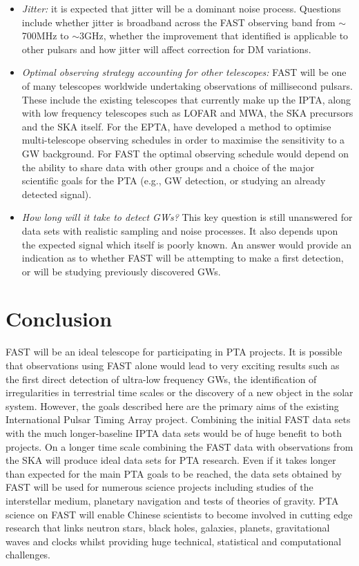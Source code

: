 \documentclass{raa}            %
\begin{document}
\begin{itemize}
\item \emph{Jitter:} it is expected that jitter will be a dominant noise process.  Questions include whether jitter is broadband across the FAST observing band from $\sim$700MHz  to $\sim$3GHz, whether the improvement that \cite{ovdb13} identified is applicable to other pulsars and how jitter will affect correction for DM variations.

\item \emph{Optimal observing strategy accounting for other telescopes:} FAST will be one of many telescopes worldwide undertaking observations of millisecond pulsars.  These include the existing telescopes that currently make up the IPTA, along with low frequency telescopes such as LOFAR and MWA, the SKA precursors and the SKA itself.  For the EPTA, \cite{lbj+12} have developed a method to optimise multi-telescope observing schedules in order to maximise the sensitivity to a GW background. For FAST the optimal observing schedule would depend on the ability to share data with other groups and a choice of the major scientific goals for the PTA (e.g., GW detection, or studying an already detected signal).

\item \emph{How long will it take to detect GWs?} This key question is still unanswered for data sets with realistic sampling and noise processes. It also depends upon the expected signal which itself is poorly known. An answer would provide an indication as to whether FAST will be attempting to make a first detection, or will be studying previously discovered GWs.
\end{itemize}

\section{Conclusion}

FAST will be an ideal telescope for participating in PTA projects.  It is possible that observations using FAST alone would lead to very exciting results such as the first direct detection of ultra-low frequency GWs, the identification of irregularities in terrestrial time scales or the discovery of a new object in the solar system.  However, the goals described here are the primary aims of the existing International Pulsar Timing Array project.  Combining the initial FAST data sets with the much longer-baseline IPTA data sets would be of huge benefit to both projects.  On a longer time scale combining the FAST data with observations from the SKA will produce ideal data sets for PTA research.  Even if it takes longer than expected for the main PTA goals to be reached, the data sets obtained by FAST will be used for numerous science projects including studies of the interstellar medium, planetary navigation and tests of theories of gravity. PTA science on FAST will enable Chinese scientists to become involved in cutting edge research that links neutron stars, black holes, galaxies, planets, gravitational waves and clocks whilst providing huge technical, statistical and computational challenges.
\end{document}
